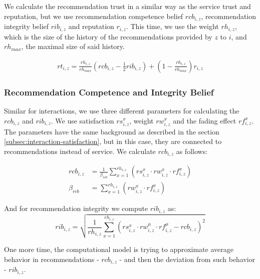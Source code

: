 We calculate the recommendation trust in a similar way as the service trust and reputation, but we use recommendation competence belief $rcb_{i, z}$, recommendation integrity belief $rib_{i,z}$ and reputation $r_{i, z}$.
This time, we use the weight $rh_{i,z}$, which is the size of the history of the recommendations provided by $z$ to $i$, and $rh_{max}$, the maximal size of said history.

\begin{equation}
\label{eq:recommendation-trust}
\begin{split}
    rt_{i, z} = \frac{rh_{i,z}}{rh_{max}} \left(rcb_{i,z} - \frac{1}{2} rib_{i, z} \right) + \left(1 - \frac{rh_{i,z}}{rh_{max}} \right) r_{i,z}
\end{split}
\end{equation}

\subsubsection{Recommendation Competence and Integrity Belief}
\label{subsubsec:recommendation-competence-integrity-belief}
Similar for interactions, we use three different parameters for calculating the $rcb_{i, z}$ and $rib_{i,z}$. 
We use satisfaction $rs^{x}_{i, z}$, weight $rw^{x}_{i, z}$ and the fading effect $rf^{x}_{i, z}$. 
The parameters have the same background as described in the section \ref{subsec:interaction-satisfaction}, but in this case, they are connected to recommendations instead of service.
We calculate $rcb_{i, z}$ as follows:

\begin{equation}
\begin{split}
    rcb_{i, z} &= \frac{1}{\beta_{rcb}} \sum_{x = 1}^{rh_{i, z}}\left(rs_{i,z}^{x} \cdot rw_{i, z}^{x} \cdot rf_{i,z}^{x}\right) \\
    \beta_{rcb} &= \sum_{x = 1}^{rh_{i, z}}\left(rw_{i, z}^{x} \cdot rf_{i,z}^{x}\right)
\end{split}
\end{equation}

\noindent
And for recommendation integrity we compute $rib_{i, z}$ as:
\begin{equation}
    rib_{i, z} = \sqrt{\frac{1}{rh_{i, z}} \sum_{x=1}^{rh_{i,z}} \left(rs_{i,z}^{x} \cdot rw_{i, z}^{\mu} \cdot rf_{i,z}^{\mu} - rcb_{i,z}\right)^{2}}
\end{equation}

\noindent
One more time, the computational model is trying to approximate average behavior in recommendations - $rcb_{i,z}$ - and then the deviation from such behavior - $rib_{i,z}$.

